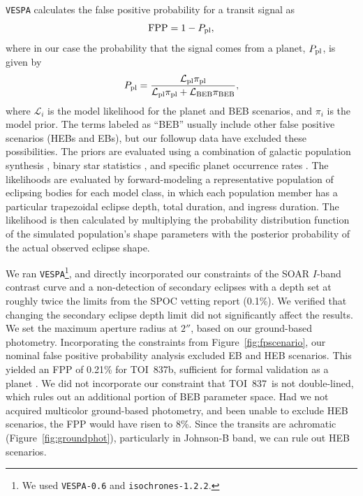 \documentclass[12pt,twocolumn,tighten]{aastex63}
\newcommand{\tn}{TOI~837} %
\newcommand{\pn}{TOI~837b} %
\begin{document}
\texttt{VESPA} calculates the false positive probability for a transit
signal as
\begin{equation}
  {\rm FPP} = 1 - P_{\rm pl},
\end{equation}
where in our case the probability that the signal comes from a planet,
$P_{\rm pl}$, is given by
\begin{align}
  P_{\rm pl} = 
  \frac{
    \mathcal{L}_{\rm pl}\pi_{\rm pl}
  }{
    \mathcal{L}_{\rm pl}\pi_{\rm pl} + \mathcal{L}_{\rm BEB}\pi_{\rm BEB}
  },
\end{align}
where $\mathcal{L}_i$ is the model likelihood for the planet and BEB
scenarios, and $\pi_i$ is the model prior.  The terms labeled as
``BEB'' usually include other false positive scenarios (HEBs and EBs),
but our followup data have excluded these possibilities.  The priors
are evaluated using a combination of galactic population synthesis
\citep{girardi_star_2005}, binary star statistics
\citep{raghavan_survey_2010}, and specific planet occurrence rates
\citep[][Section~3.4]{morton_efficient_2012}.  The likelihoods are
evaluated by forward-modeling a representative population of eclipsing
bodies for each model class, in which each population member has a
particular trapezoidal eclipse depth, total duration, and ingress
duration.  The likelihood is then calculated by multiplying the
probability distribution function of the simulated population's shape
parameters with the posterior probability of the actual observed
eclipse shape.

We ran \texttt{VESPA}\footnote{We used \texttt{VESPA-0.6} and
\texttt{isochrones-1.2.2}.}, and directly incorporated our constraints
of the SOAR $I$-band contrast curve and a non-detection of secondary
eclipses with a depth set at roughly twice the limits from the SPOC
vetting report (0.1\%).  
We verified that changing the secondary eclipse depth limit did not
significantly affect the results.  We set the maximum aperture radius
at $2''$, based on our ground-based photometry.  Incorporating the
constraints from Figure~\ref{fig:fpscenario}, our nominal false
positive probability analysis excluded EB and HEB scenarios.  This
yielded an FPP of 0.21\% for \pn, sufficient for formal validation as
a planet \citep{morton_efficient_2012}.  We did not incorporate our
constraint that \tn\ is not double-lined, which rules out an
additional portion of BEB parameter space.  Had we not acquired
multicolor ground-based photometry, and been unable to exclude HEB
scenarios, the FPP would have risen to 8\%.  Since the transits are
achromatic (Figure~\ref{fig:groundphot}), particularly in Johnson-B
band, we can rule out HEB scenarios.
\end{document}
